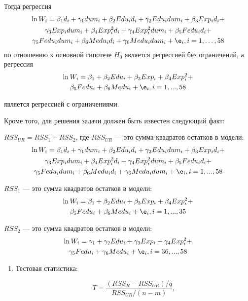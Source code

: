 \documentclass[pdftex,11pt,openany]{book}\usepackage[]{graphicx}\usepackage[]{color}
\begin{document}
\begin{solution}
Тогда регрессия
\begin{multline}
\ln W_i=\beta_1 d_i+\gamma_1 dum_i+\beta_2 Edu_i d_i+\gamma_2 Edu_i dum_i+\beta_3 Exp_i d_i+\\
\gamma_3 Exp_i dum_i+\beta_4 Exp_i^2 d_i+
\gamma_4 Exp_i^2 dum_i+\beta_5 Fedu_i d_i +\\
\gamma_5 Fedu_i dum_i+\beta_6 Medu_i d_i+\gamma_6 Medu_i dum_i+\e_i, i=1,\ldots,58
\end{multline}
по отношению к основной гипотезе $H_0$ является регрессией без ограничений, а регрессия 
\begin{multline}
\ln W_i=\beta_1 +\beta_2 Edu_i+\beta_3 Exp_i+\beta_4 Exp_i^2+\\
\beta_5 Fedu_i+\beta_6 Medu_i+\e_i, i=1,...,58 
\end{multline}

является регрессией с ограничениями.

Кроме того, для решения задачи должен быть известен следующий факт:

$RSS_{UR}=RSS_1+RSS_2$, где $RSS_{UR}$ --- это сумма квадратов остатков в модели:
\begin{multline}
\ln W_i=\beta_1  d_i+\gamma_1 dum_i+\beta_2 Edu_i d_i+\gamma_2 Edu_i dum_i+\beta_3 Exp_i d_i+\\
\gamma_3 Exp_i dum_i+\beta_4 Exp_i^2 d_i
+ \gamma_4 Exp_i^2 dum_i+\beta_5 Fedu_i d _i +\\
\gamma_5 Fedu_i dum_i+\beta_6 Medu_i d_i+\gamma_6 Medu_i dum_i+\e_i, i=1,...,58
\end{multline}

$RSS_1$ --- это сумма квадратов остатков в модели:
\begin{multline}
\ln W_i=\beta_1 +\beta_2 Edu_i+\beta_3 Exp_i+\beta_4 Exp_i^2+\\
\beta_5 Fedu_i+\beta_6 Medu_i+\e_i, i=1,...,35
\end{multline}

$RSS_2$ --- это сумма квадратов остатков в модели:
\begin{multline}
\ln W_i=\gamma_1 +\gamma_2 Edu_i+\gamma_3 Exp_i+\gamma_4 Exp_i^2+\\
\gamma_5 Fedu_i+\gamma_6 Medu_i+\e_i, i=36,...,58
\end{multline}


\begin{enumerate}
\item Тестовая статистика:

\[
T = \frac{(RSS_R-RSS_{UR})/q}{RSS_{UR}/(n-m)},
\]


\end{enumerate}
\end{solution}
\end{document}
